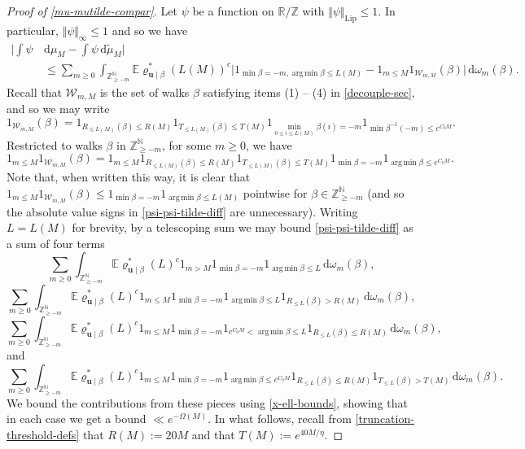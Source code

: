 \documentclass[11pt,reqno]{amsart}
\DeclareMathOperator*{\argmin}{arg\,min}
\numberwithin{equation}{section}
\theoremstyle{definition}
\theoremstyle{remark}
\newcommand{\mb}{\mathbb}
\newcommand{\mbf}{\mathbf}
\renewcommand{\le}{\leqslant}
\renewcommand{\ge}{\geqslant}
\newcommand\Z{\mathbb{Z}}
\newcommand\R{\mathbb{R}}
\newcommand\N{\mathbb{N}}
\newcommand\Lip{\operatorname{Lip}}
\begin{document}
\begin{proof}[Proof of \cref{mu-mutilde-compar}]
Let $\psi$ be a function on $\R/\Z$ with $\Vert \psi \Vert_{\Lip} \le 1$. In particular, $\Vert \psi \Vert_{\infty} \le 1$ and so we have
\begin{align}\nonumber \big|\int \psi \, & \mathrm{d}\mu_M - \int \psi \, \mathrm{d} \tilde\mu_M \big| \\ &  \le  \sum_{m \ge 0}\int_{\Z^\N_{\ge -m}} \mb{E} \varrho^*_{\mbf{u} \mid \beta}(L(M))^c \big| 1_{\min \beta = -m, \argmin \beta \le L(M)} - 1_{m \le M}1_{\mathscr{W}_{m,M}}(\beta)\big| \, \mathrm{d}\omega_m(\beta).\label{psi-psi-tilde-diff}\end{align}
Recall that $\mathscr{W}_{m,M}$ is the set of walks $\beta$ satisfying items (1) -- (4) in \cref{decouple-sec}, and so we may write
\[ 1_{\mathscr{W}_{m,M}}(\beta) = 1_{R_{\le L(M)}(\beta) \le R(M)} 1_{T_{\le L(M)}(\beta) \le T(M)} 1_{\min_{0 \le i \le L(M)} \beta(i) = -m} 1_{\min \beta^{-1}(-m) \le e^{C_0 M}}.\] Restricted to walks $\beta$ in $\Z^{\N}_{\ge -m}$, for some $m \ge 0$, we have
\[ 1_{m \le M} 1_{\mathscr{W}_{m,M}}(\beta) = 1_{m \le M} 1_{R_{\le L(M)}(\beta) \le R(M)} 1_{T_{\le L(M)}(\beta) \le T(M)} 1_{\min \beta = -m} 1_{\argmin \beta \le e^{C_0 M}}.\] Note that, when written this way, it is clear that $1_{m \le M} 1_{\mathscr{W}_{m,M}}(\beta) \le 1_{\min \beta = -m} 1_{\argmin \beta \le L(M)}$ pointwise for $\beta \in \Z_{\ge -m}^{\N}$ (and so the absolute value signs in \cref{psi-psi-tilde-diff} are unnecessary). Writing $L = L(M)$ for brevity, by a telescoping sum we may bound \cref{psi-psi-tilde-diff} as a sum of four terms
\begin{equation}\label{15-term-1}
\sum_{m \ge 0} \int_{\Z_{\ge -m}^{\N}} \mb{E} \varrho^*_{\mbf{u} \mid \beta}(L)^c 1_{m > M} 1_{\min \beta = -m} 1_{\argmin \beta \le L} \, \mathrm{d}\omega_m(\beta),
\end{equation}
\begin{equation}\label{15-term-2}
\sum_{m \ge 0} \int_{\Z_{\ge -m}^{\N}} \mb{E} \varrho^*_{\mbf{u} \mid \beta}(L)^c  1_{m \le M} 1_{\min \beta = -m} 1_{\argmin \beta \le L} 1_{R_{\le L}(\beta) > R(M)} \, \mathrm{d}\omega_m(\beta),
\end{equation}
\begin{equation}\label{15-term-3}
\sum_{m \ge 0} \int_{\Z_{\ge -m}^{\N}} \mb{E} \varrho^*_{\mbf{u} \mid \beta}(L)^c 1_{m \le M} 1_{\min \beta = -m} 1_{e^{C_0 M} < \argmin \beta \le L} 1_{R_{\le L}(\beta) \le R(M)} \, \mathrm{d}\omega_m(\beta),
\end{equation}
and
\begin{equation}\label{15-term-4}
\sum_{m \ge 0} \int_{\Z_{\ge -m}^{\N}} \mb{E} \varrho^*_{\mbf{u} \mid \beta}(L)^c  1_{m \le M} 1_{\min \beta = -m} 1_{\argmin \beta \le e^{C_0 M}} 1_{R_{\le L}(\beta) \le R(M)} 1_{T_{\le L}(\beta) > T(M)} \, \mathrm{d}\omega_m(\beta).
\end{equation}
We bound the contributions from these pieces using \cref{x-ell-bounds}, showing that in each case we get a bound $\ll e^{-\Omega(M)}$. In what follows, recall from \cref{truncation-threshold-defs} that $R(M) := 20 M$ and that $T(M) := e^{40M/\eta}$.


\end{proof}
\end{document}
